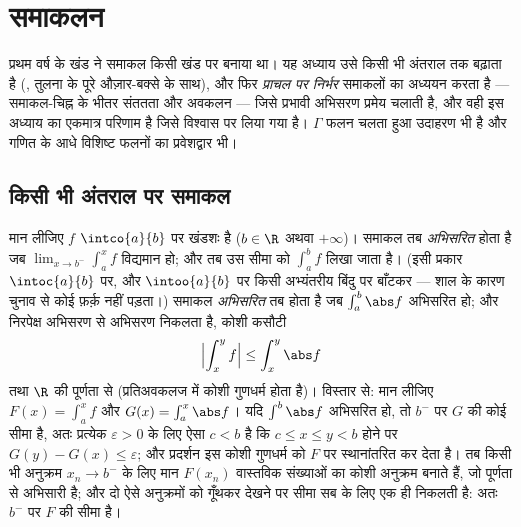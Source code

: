 \chapter{समाकलन}\label{ch:b2:integration}

प्रथम वर्ष के खंड ने समाकल किसी खंड पर बनाया था। यह अध्याय उसे किसी भी
अंतराल तक बढ़ाता है (, तुलना के पूरे औज़ार-बक्से के साथ), और
फिर \emph{प्राचल पर निर्भर} समाकलों का अध्ययन करता है --- समाकल-चिह्न के
भीतर संततता और अवकलन --- जिसे प्रभावी अभिसरण प्रमेय चलाती है, और वही इस
अध्याय का एकमात्र परिणाम है जिसे विश्वास पर लिया गया है। $\Gamma$ फलन चलता
हुआ उदाहरण भी है और गणित के आधे विशिष्ट फलनों का प्रवेशद्वार भी।

\section{किसी भी अंतराल पर समाकल}

\begin{definition}\label{def:b2:integration:improper}
मान लीजिए $f$ $\intco{a}{b}$ पर खंडशः  है ($b \in \R$ अथवा $+\infty$)। समाकल तब
\emph{अभिसरित} होता है जब $\lim_{x \to b^-} \int_a^x f$ विद्यमान हो; और तब उस
सीमा को $\int_a^b f$ लिखा जाता है। (इसी प्रकार $\intoc{a}{b}$ पर, और $\intoo{a}{b}$ पर किसी अभ्यंतरीय
बिंदु पर बाँटकर --- शाल के कारण चुनाव से कोई फ़र्क़ नहीं पड़ता।) समाकल
\emph{ अभिसरित} तब होता है जब $\int_a^b \abs f$ अभिसरित हो; और निरपेक्ष
अभिसरण से अभिसरण निकलता है, कोशी कसौटी
\[
\Bigl| \int_x^{y} f \Bigr| \leq \int_x^{y} \abs f
\]
तथा $\R$ की पूर्णता से (प्रतिअवकलज में कोशी गुणधर्म होता है)। विस्तार से:
मान लीजिए $F(x) = \int_a^x f$ और $G(x) = \int_a^x \abs
f$। यदि $\int^b\abs f$ अभिसरित हो, तो $b^-$ पर $G$ की कोई सीमा
है, अतः प्रत्येक $\varepsilon > 0$ के लिए ऐसा $c < b$ है कि $c \leq x \leq y < b$ होने पर $G(y) - G(x)
\leq \varepsilon$; और
प्रदर्शन इस कोशी गुणधर्म को $F$ पर स्थानांतरित कर देता है। तब किसी भी
अनुक्रम $x_n
\to b^-$ के लिए मान $F(x_n)$ वास्तविक संख्याओं का कोशी अनुक्रम बनाते हैं,
जो पूर्णता से अभिसारी है; और दो ऐसे अनुक्रमों को गूँथकर देखने पर सीमा सब
के लिए एक ही निकलती है: अतः $b^-$ पर $F$ की सीमा है।
\end{definition}


